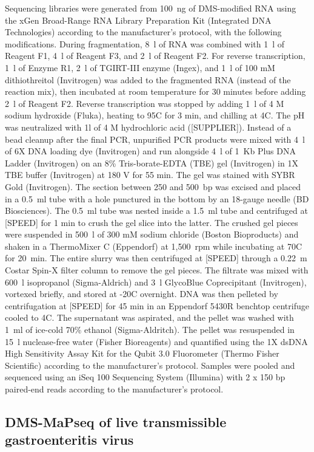 \documentclass[main.tex]{subfiles}
\begin{document}
Sequencing libraries were generated from 100~ng of DMS-modified RNA using the xGen Broad-Range RNA Library Preparation Kit (Integrated DNA Technologies) according to the manufacturer’s protocol, with the following modifications.
During fragmentation, 8~\textmu l of RNA was combined with 1~\textmu l of Reagent F1, 4~\textmu l of Reagent F3, and 2~\textmu l of Reagent F2. 
For reverse transcription, 1~\textmu l of Enzyme R1, 2~\textmu l of TGIRT-III enzyme (Ingex), and 1~\textmu l of 100 mM dithiothreitol (Invitrogen) was added to the fragmented RNA (instead of the reaction mix), then incubated at room temperature for 30 minutes before adding 2~\textmu l of Reagent F2.
Reverse transcription was stopped by adding 1~\textmu l of 4 M sodium hydroxide (Fluka), heating to 95\textdegree C for 3 min, and chilling at 4\textdegree C.
The pH was neutralized with 1\textmu l of 4 M hydrochloric acid ([SUPPLIER]).
Instead of a bead cleanup after the final PCR, unpurified PCR products were mixed with 4~\textmu l of 6X DNA loading dye (Invitrogen) and run alongside 4~\textmu l of 1~Kb Plus DNA Ladder (Invitrogen) on an 8\% Tris-borate-EDTA (TBE) gel (Invitrogen) in 1X TBE buffer (Invitrogen) at 180 V for 55 min.
The gel was stained with SYBR Gold (Invitrogen).
The section between 250 and 500~bp was excised and placed in a 0.5~ml tube with a hole punctured in the bottom by an 18-gauge needle (BD Biosciences).
The 0.5~ml tube was nested inside a 1.5~ml tube and centrifuged at [SPEED] for 1 min to crush the gel slice into the latter.
The crushed gel pieces were suspended in 500~\textmu l of 300 mM sodium chloride (Boston Bioproducts) and shaken in a ThermoMixer C (Eppendorf) at 1,500~rpm while incubating at 70\textdegree C for 20~min.
The entire slurry was then centrifuged at [SPEED] through a 0.22~\textmu m Costar Spin-X filter column to remove the gel pieces.
The filtrate was mixed with 600~\textmu l isopropanol (Sigma-Aldrich) and 3~\textmu l GlycoBlue Coprecipitant (Invitrogen), vortexed briefly, and stored at -20\textdegree C overnight.
DNA was then pelleted by centrifugation at [SPEED] for 45 min in an Eppendorf 5430R benchtop centrifuge cooled to 4\textdegree C.
The supernatant was aspirated, and the pellet was washed with 1~ml of ice-cold 70\% ethanol (Sigma-Aldritch).
The pellet was resuspended in 15~\textmu l nuclease-free water (Fisher Bioreagents) and quantified using the 1X dsDNA High Sensitivity Assay Kit for the Qubit 3.0 Fluorometer (Thermo Fisher Scientific) according to the manufacturer's protocol.
Samples were pooled and sequenced using an iSeq 100 Sequencing System (Illumina) with 2 x 150 bp paired-end reads according to the manufacturer's protocol.

\subsection{DMS-MaPseq of live transmissible gastroenteritis virus}
\end{document}
